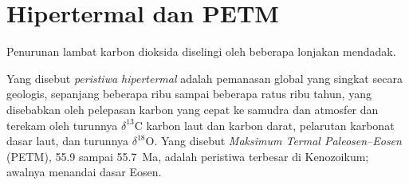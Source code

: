 \section{Hipertermal dan PETM}\label{sec:b2:deep-time-climate:petm}

Penurunan lambat karbon dioksida diselingi oleh beberapa lonjakan mendadak.

\begin{definition}\label{def:b2:deep-time-climate:petm}
Yang disebut \emph{peristiwa hipertermal} adalah pemanasan global yang singkat secara geologis, sepanjang beberapa
ribu sampai beberapa ratus ribu tahun, yang disebabkan oleh pelepasan karbon yang cepat ke samudra dan
atmosfer dan terekam oleh turunnya $\delta^{13}$C karbon laut dan karbon darat,
pelarutan karbonat dasar laut, dan turunnya $\delta^{18}$O. Yang disebut \emph{Maksimum Termal
Paleosen--Eosen} (PETM), 55.9 sampai \qty{55.7}{Ma}, adalah
peristiwa terbesar di Kenozoikum; awalnya menandai dasar Eosen.
\end{definition}


